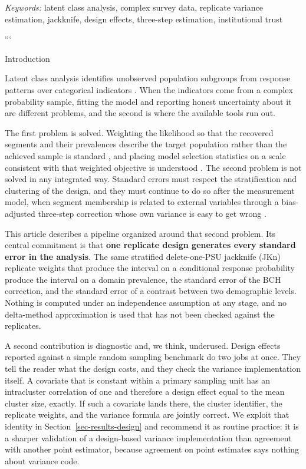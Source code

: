 \documentclass[
  12pt]{article}
\begin{document}
\noindent%
{\it Keywords:} latent class analysis, complex survey data, replicate
variance estimation, jackknife, design effects, three-step
estimation, institutional trust
\vfill

\newpage
{} %


```

Introduction

Latent class analysis identifies unobserved population subgroups from
response patterns over categorical indicators
\citep{lazarsfeld1968, goodman1974}. When the indicators come from a
complex probability sample, fitting the model and reporting honest
uncertainty about it are different problems, and the second is where the
available tools run out.

The first problem is solved. Weighting the likelihood so that the
recovered segments and their prevalences describe the target population
rather than the achieved sample is standard
\citep{patterson2002, vermunt2007, asparouhov2005}, and placing model
selection statistics on a scale consistent with that weighted objective
is understood \citep{lumley2015}. The second problem is not solved in
any integrated way. Standard errors must respect the stratification and
clustering of the design, and they must continue to do so after the
measurement model, when segment membership is related to external
variables through a bias-adjusted three-step correction whose own
variance is easy to get wrong \citep{vermunt2010, bakk2014}.

This article describes a pipeline organized around that second problem.
Its central commitment is that \textbf{one replicate design generates
every standard error in the analysis}. The same stratified
delete-one-PSU jackknife (JKn) replicate weights that produce the
interval on a conditional response probability produce the interval on a
domain prevalence, the standard error of the BCH correction, and the
standard error of a contrast between two demographic levels. Nothing is
computed under an independence assumption at any stage, and no
delta-method approximation is used that has not been checked against the
replicates.

A second contribution is diagnostic and, we think, underused. Design
effects reported against a simple random sampling benchmark do two jobs
at once. They tell the reader what the design costs, and they check the
variance implementation itself. A covariate that is constant within a
primary sampling unit has an intracluster correlation of one and
therefore a design effect equal to the mean cluster size, exactly. If
such a covariate lands there, the cluster identifier, the replicate
weights, and the variance formula are jointly correct. We exploit that
identity in Section~\ref{sec-results-design} and recommend it as routine
practice: it is a sharper validation of a design-based variance
implementation than agreement with another point estimator, because
agreement on point estimates says nothing about variance code.
\end{document}
